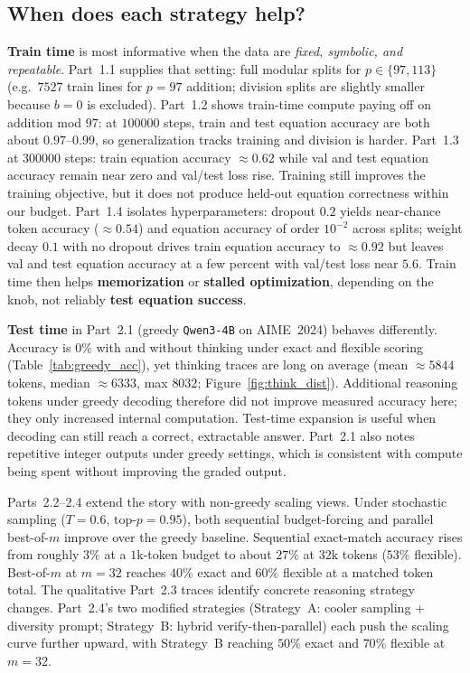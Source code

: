 \documentclass[11pt]{article}
\begin{document}
\subsection{When does each strategy help?}

\textbf{Train time} is most informative when the data are \emph{fixed, symbolic, and repeatable}. Part~1.1 supplies that setting: full modular splits for $p \in \{97,113\}$ (e.g.\ $7527$ train lines for $p=97$ addition; division splits are slightly smaller because $b=0$ is excluded). Part~1.2 shows train-time compute paying off on addition mod $97$: at $100000$ steps, train and test equation accuracy are both about $0.97$--$0.99$, so generalization tracks training and division is harder. Part~1.3 at $300000$ steps: train equation accuracy $\approx 0.62$ while val and test equation accuracy remain near zero and val/test loss rise. Training still improves the training objective, but it does not produce held-out equation correctness within our budget. Part~1.4 isolates hyperparameters: dropout $0.2$ yields near-chance token accuracy ($\approx 0.54$) and equation accuracy of order $10^{-2}$ across splits; weight decay $0.1$ with no dropout drives train equation accuracy to $\approx 0.92$ but leaves val and test equation accuracy at a few percent with val/test loss near $5.6$. Train time then helps \textbf{memorization} or \textbf{stalled optimization}, depending on the knob, not reliably \textbf{test equation success}.

\textbf{Test time} in Part~2.1 (greedy \texttt{Qwen3-4B} on AIME~2024) behaves differently. Accuracy is $0\%$ with and without thinking under exact and flexible scoring (Table~\ref{tab:greedy_acc}), yet thinking traces are long on average (mean $\approx 5844$ tokens, median $\approx 6333$, max $8032$; Figure~\ref{fig:think_dist}). Additional reasoning tokens under greedy decoding therefore did not improve measured accuracy here; they only increased internal computation. Test-time expansion is useful when decoding can still reach a correct, extractable answer. Part~2.1 also notes repetitive integer outputs under greedy settings, which is consistent with compute being spent without improving the graded output.

Parts~2.2--2.4 extend the story with non-greedy scaling views. Under stochastic sampling ($T{=}0.6$, top-$p{=}0.95$), both sequential budget-forcing and parallel best-of-$m$ improve over the greedy baseline. Sequential exact-match accuracy rises from roughly $3\%$ at a $1\mathrm{k}$-token budget to about $27\%$ at $32\mathrm{k}$ tokens ($53\%$ flexible). Best-of-$m$ at $m{=}32$ reaches $40\%$ exact and $60\%$ flexible at a matched token total. The qualitative Part~2.3 traces identify concrete reasoning strategy changes. Part~2.4's two modified strategies (Strategy~A: cooler sampling + diversity prompt; Strategy~B: hybrid verify-then-parallel) each push the scaling curve further upward, with Strategy~B reaching $50\%$ exact and $70\%$ flexible at $m{=}32$.
\end{document}
